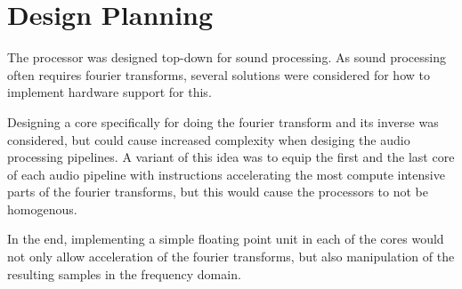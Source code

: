\FloatBarrier
\section{Design Planning}\label{sec:fpga-design}

The processor was designed top-down for sound processing. As sound processing
often requires fourier transforms, several solutions were considered for how
to implement hardware support for this.

Designing a core specifically for doing the fourier transform and its inverse
was considered, but could cause increased complexity when desiging the
audio processing pipelines. A variant of this idea was to equip the first
and the last core of each audio pipeline with instructions accelerating
the most compute intensive parts of the fourier transforms, but this
would cause the processors to not be homogenous.

In the end, implementing a simple floating point unit in each of the cores
would not only allow acceleration of the fourier transforms, but also manipulation
of the resulting samples in the frequency domain.

